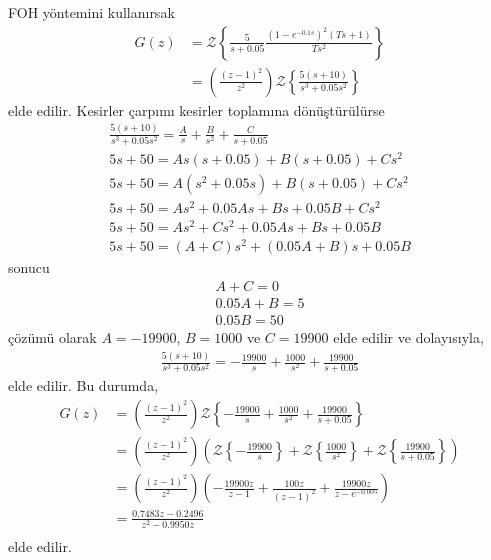 FOH yöntemini kullanırsak
\begin{equation}
    \begin{split}
        G(z)&=\mathcal{Z}\left\{
            \frac{5}{s+0.05}\frac{(1-e^{-0.1s})^2(Ts+1)}{Ts^2}
        \right\}\\
        &=\left(\frac{(z-1)^2}{z^2}\right)\mathcal{Z}\left\{
            \frac{5(s+10)}{s^3+0.05s^2}
        \right\}
    \end{split}
\end{equation}
elde edilir. Kesirler çarpımı kesirler toplamına dönüştürülürse
\begin{equation}
    \begin{split}
        \frac{5(s+10)}{s^3+0.05s^2}=\frac{A}{s}+\frac{B}{s^2}+\frac{C}{s+0.05}\\
        5s+50=As(s+0.05)+B(s+0.05)+Cs^2\\
        5s+50=A(s^2+0.05s)+B(s+0.05)+Cs^2\\
        5s+50=As^2+0.05As+Bs+0.05B+Cs^2\\
        5s+50=As^2+Cs^2+0.05As+Bs+0.05B\\
        5s+50=(A+C)s^2+(0.05A+B)s+0.05B
    \end{split}
\end{equation}
sonucu
\begin{equation}
    \begin{split}
        A+C=0\\
        0.05A+B=5\\
        0.05B=50
    \end{split}
\end{equation}
çözümü olarak $A=-19900$, $B=1000$ ve $C=19900$ elde edilir ve dolayısıyla,
\begin{equation}
    \begin{split}
        \frac{5(s+10)}{s^3+0.05s^2}=-\frac{19900}{s}+\frac{1000}{s^2}+\frac{19900}{s+0.05}
    \end{split}
\end{equation}
elde edilir.
Bu durumda,
\begin{equation}
    \begin{split}
        G(z)&=\left(\frac{(z-1)^2}{z^2}\right)\mathcal{Z}\left\{
            -\frac{19900}{s}+\frac{1000}{s^2}+\frac{19900}{s+0.05}
        \right\}\\
        &=\left(\frac{(z-1)^2}{z^2}\right)\left(\mathcal{Z}\left\{
            -\frac{19900}{s}\right\}+\mathcal{Z}\left\{\frac{1000}{s^2}\right\}+\mathcal{Z}\left\{\frac{19900}{s+0.05}
        \right\}\right)\\
        &=\left(\frac{(z-1)^2}{z^2}\right)\left(-\frac{19900z}{z-1}+\frac{100z}{(z-1)^2}+\frac{19900z}{z-e^{-0.005}}\right)\\
        &=\frac{0.7483z-0.2496}{z^2-0.9950z}\\
    \end{split}
\end{equation}
elde edilir.

